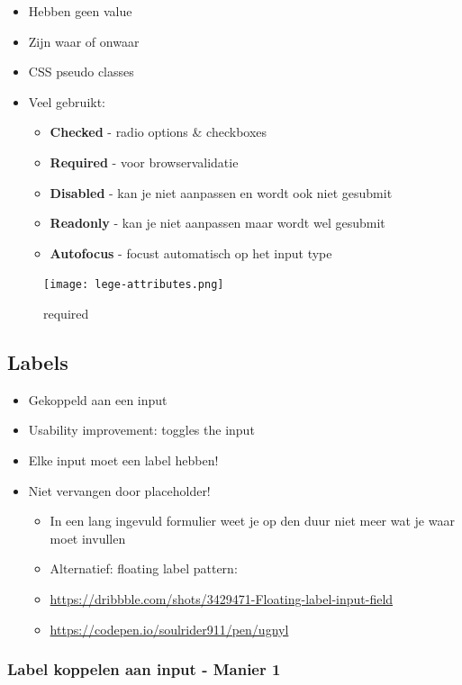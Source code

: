 \documentclass{article}
\newcommand{\bold}[1]{\textbf{#1}}
\begin{document}
\begin{itemize}
    \item Hebben geen value
    \item Zijn waar of onwaar
    \item CSS pseudo classes
    \item Veel gebruikt:
    \begin{itemize}
        \item \bold{Checked} - radio options \& checkboxes
        \item \bold{Required} - voor browservalidatie
        \item \bold{Disabled} - kan je niet aanpassen en wordt ook niet gesubmit
        \item \bold{Readonly} - kan je niet aanpassen maar wordt wel gesubmit
        \item \bold{Autofocus} - focust automatisch op het input type
    \end{itemize}
\end{itemize}

\begin{figure}[H]
    \centering
    \texttt{[image: lege-attributes.png]}
    \caption{required}
\end{figure}


\subsection{Labels}
\begin{itemize}
    \item Gekoppeld aan een input
    \item Usability improvement: toggles the input
    \item Elke input moet een label hebben!
    \item Niet vervangen door placeholder!
    \begin{itemize}
        \item In een lang ingevuld formulier weet je op den duur niet meer wat je waar moet invullen
        \item Alternatief: floating label pattern:
        \item \url{https://dribbble.com/shots/3429471-Floating-label-input-field}
        \item \url{https://codepen.io/soulrider911/pen/ugnyl}
    \end{itemize}
\end{itemize}

\subsubsection{Label koppelen aan input - Manier 1}
\end{document}
